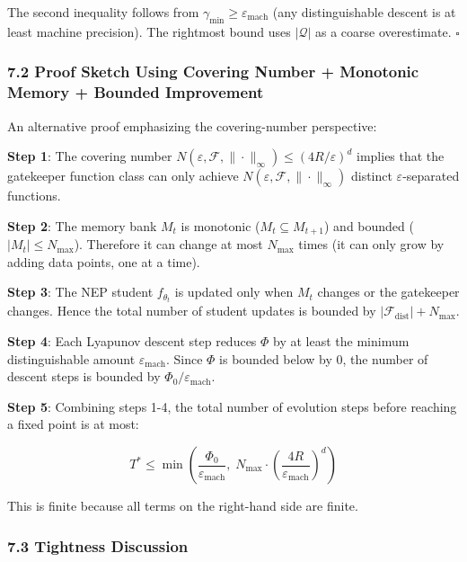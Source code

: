 \documentclass[
  12pt,
]{ctexart}
\begin{document}
The second inequality follows from
\(\gamma_{\min} \geq \varepsilon_{\text{mach}}\) (any distinguishable
descent is at least machine precision). The rightmost bound uses
\(|\mathcal{Q}|\) as a coarse overestimate. \(\square\)

\subsubsection{7.2 Proof Sketch Using Covering Number + Monotonic Memory
+ Bounded
Improvement}\label{proof-sketch-using-covering-number-monotonic-memory-bounded-improvement}

An alternative proof emphasizing the covering-number perspective:

\textbf{Step 1}: The covering number
\(N(\varepsilon, \mathcal{F}, \|\cdot\|_\infty) \leq (4R/\varepsilon)^d\)
implies that the gatekeeper function class can only achieve
\(N(\varepsilon, \mathcal{F}, \|\cdot\|_\infty)\) distinct
\(\varepsilon\)-separated functions.

\textbf{Step 2}: The memory bank \(M_t\) is monotonic
(\(M_t \subseteq M_{t+1}\)) and bounded (\(|M_t| \leq N_{\text{max}}\)).
Therefore it can change at most \(N_{\text{max}}\) times (it can only
grow by adding data points, one at a time).

\textbf{Step 3}: The NEP student \(f_{\theta_t}\) is updated only when
\(M_t\) changes or the gatekeeper changes. Hence the total number of
student updates is bounded by
\(|\mathcal{F}_{\text{dist}}| + N_{\text{max}}\).

\textbf{Step 4}: Each Lyapunov descent step reduces \(\Phi\) by at least
the minimum distinguishable amount \(\varepsilon_{\text{mach}}\). Since
\(\Phi\) is bounded below by \(0\), the number of descent steps is
bounded by \(\Phi_0/\varepsilon_{\text{mach}}\).

\textbf{Step 5}: Combining steps 1-4, the total number of evolution
steps before reaching a fixed point is at most:

\[T^* \leq \min\left( \frac{\Phi_0}{\varepsilon_{\text{mach}}}, \; N_{\text{max}} \cdot \left( \frac{4R}{\varepsilon_{\text{mach}}} \right)^d \right)\]

This is finite because all terms on the right-hand side are finite.

\subsubsection{7.3 Tightness Discussion}\label{tightness-discussion}
\end{document}
